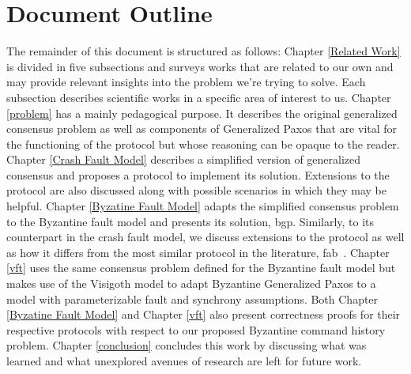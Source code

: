 \section{Document Outline}
{\color{red}
The remainder of this document is structured as follows: Chapter \ref{Related Work} is divided in five subsections and surveys works that are related to our own and may provide relevant insights into the problem we're trying to solve. Each subsection describes scientific works in a specific area of interest to us. Chapter \ref{problem} has a mainly pedagogical purpose. It describes the original generalized consensus problem as well as components of Generalized Paxos that are vital for the functioning of the protocol but whose reasoning can be opaque to the reader. Chapter \ref{Crash Fault Model} describes a simplified version of generalized consensus and proposes a protocol to implement its solution. Extensions to the protocol are also discussed along with possible scenarios in which they may be helpful. Chapter \ref{Byzatine Fault Model} adapts the simplified consensus problem to the Byzantine fault model and presents its solution, \acrlong{bgp}. Similarly, to its counterpart in the crash fault model, we discuss extensions to the protocol as well as how it differs from the most similar protocol in the literature, \acrfull{fab}~\cite{Martin2006}. Chapter \ref{vft} uses the same consensus problem defined for the Byzantine fault model but makes use of the Visigoth model to adapt Byzantine Generalized Paxos to a model with parameterizable fault and synchrony assumptions. Both Chapter \ref{Byzatine Fault Model} and Chapter \ref{vft} also present correctness proofs for their respective protocols with respect to our proposed Byzantine command history problem. Chapter \ref{conclusion} concludes this work by discussing what was learned and what unexplored avenues of research are left for future work.
}